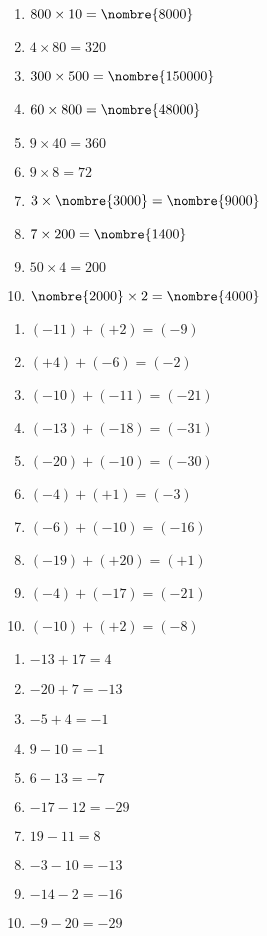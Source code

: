 \documentclass[a4paper,11pt,fleqn]{article}
\begin{document}
\newpage
{}
\begin{correction}\exo{}

\begin{multicols}{2}
\begin{enumerate}
	\item $ 800 \times 10 = \nombre{8000} $
	\item $ 4 \times 80 = 320 $
	\item $ 300 \times 500 = \nombre{150000} $
	\item $ 60 \times 800 = \nombre{48000} $
	\item $ 9 \times 40 = 360 $
	\item $ 9 \times 8 = 72 $
	\item $ 3 \times \nombre{3000} = \nombre{9000} $
	\item $ 7 \times 200 = \nombre{1400} $
	\item $ 50 \times 4 = 200 $
	\item $ \nombre{2000} \times 2 = \nombre{4000} $
\end{enumerate}
\end{multicols}

\exo{}

\begin{multicols}{2}
\begin{enumerate}
	\item $ (-11) + (+2) = (-9) $
	\item $ (+4) + (-6) = (-2) $
	\item $ (-10) + (-11) = (-21) $
	\item $ (-13) + (-18) = (-31) $
	\item $ (-20) + (-10) = (-30) $
	\item $ (-4) + (+1) = (-3) $
	\item $ (-6) + (-10) = (-16) $
	\item $ (-19) + (+20) = (+1) $
	\item $ (-4) + (-17) = (-21) $
	\item $ (-10) + (+2) = (-8) $
\end{enumerate}
\end{multicols}

\exo{}

\begin{multicols}{2}
\begin{enumerate}
	\item $ -13+17 = 4 $
	\item $ -20+7 = -13 $
	\item $ -5+4 = -1 $
	\item $ 9-10 = -1 $
	\item $ 6-13 = -7 $
	\item $ -17-12 = -29 $
	\item $ 19-11 = 8 $
	\item $ -3-10 = -13 $
	\item $ -14-2 = -16 $
	\item $ -9-20 = -29 $
\end{enumerate}
\end{multicols}


\end{correction}
\end{document}
